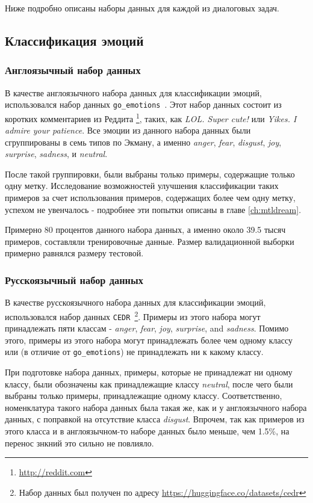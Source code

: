 Ниже подробно описаны наборы данных для каждой из диалоговых задач. 

\subsection{Классификация эмоций}
\subsubsection{Англоязычный набор данных} 
В качестве англоязычного набора данных для классификации эмоций, использовался набор данных  \texttt{go\_emotions}~\cite{go_emotions}. Этот набор данных состоит из коротких комментариев из Реддита \footnote{\url{http://reddit.com}}, таких, как \textit{LOL. Super cute!} или \textit{Yikes. I admire your patience}. Все эмоции из данного набора данных были сгруппированы в семь типов по Экману, а именно \textit{anger}, \textit{fear}, \textit{disgust}, \textit{joy}, \textit{surprise}, \textit{sadness}, и \textit{neutral}. 

После такой группировки, были выбраны только примеры, содержащие только одну метку. Исследование возможностей улучшения классификации таких примеров за счет использования примеров, содержащих более чем одну метку, успехом не увенчалось - подробнее эти попытки описаны в главе \ref{ch:mtldream}. 

Примерно 80 процентов данного набора данных, а именно около 39.5 тысяч примеров, составляли тренировочные данные. Размер валидационной выборки примерно равнялся размеру тестовой. 

\subsubsection{Русскоязычный набор данных} 
В качестве русскоязычного набора данных для классификации эмоций, использовался набор данных \texttt{CEDR}~\cite{ru_emotions}\footnote{Набор данных был получен по адресу \url{https://huggingface.co/datasets/cedr}}. Примеры из этого набора могут принадлежать пяти классам - \textit{anger}, \textit{fear}, \textit{joy}, \textit{surprise}, and \textit{sadness}. Помимо этого, примеры из этого набора могут принадлежать более чем одному классу или (в отличие от \texttt{go\_emotions}) не принадлежать ни к какому классу. 

При подготовке набора данных, примеры, которые не принадлежат ни одному классу, были обозначены как принадлежащие классу \textit{neutral}, после чего были выбраны только примеры, принадлежащие одному классу. Соответственно, номенклатура такого набора данных была такая же, как и у англоязычного набора данных, с поправкой на отсутствие класса \textit{disgust}. Впрочем, так как примеров из этого класса и в англоязычном-то наборе данных было меньше, чем 1.5\%, на перенос знкний это сильно не повлияло. 

